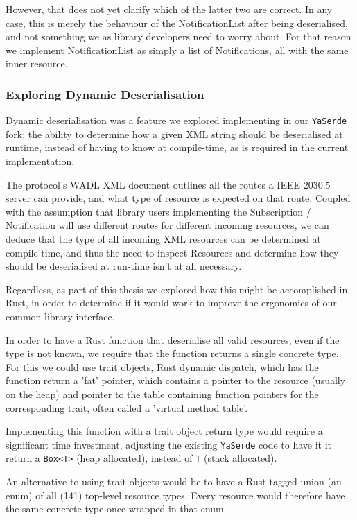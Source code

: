 However, that does not yet clarify which of the latter two are correct. In any case, this is merely the behaviour of the NotificationList after being deserialised, and not something we as library developers need to worry about. For that reason we implement NotificationList as simply a list of Notifications, all with the same inner resource.

\subsubsection{Exploring Dynamic Deserialisation}
Dynamic deserialisation was a feature we explored implementing in our \texttt{YaSerde} fork; the ability to determine how a given XML string should be deserialised at runtime, instead of having to know at compile-time, as is required in the current implementation.

The protocol's WADL XML document outlines all the routes a IEEE 2030.5 server can provide, and what type of resource is expected on that route. Coupled with the assumption that library users implementing the Subscription / Notification will use different routes for different incoming resources, we can deduce that the type of all incoming XML resources can be determined at compile time, and thus the need to inspect Resources and determine how they should be deserialised at run-time isn't at all necessary. 

Regardless, as part of this thesis we explored how this might be accomplished in Rust, in order to determine if it would work to improve the ergonomics of our common library interface.

In order to have a Rust function that deserialise all valid resources, even if the type is not known, we require that the function returns a single concrete type. For this we could use trait objects, Rust dynamic dispatch, which has the function return a 'fat' pointer, which contains a pointer to the resource (usually on the heap) and pointer to the table containing function pointers for the corresponding trait, often called a 'virtual method table'. 

Implementing this function with a trait object return type would require a significant time investment, adjusting the existing \texttt{YaSerde} code to have it it return a \texttt{Box<T>} (heap allocated), instead of \texttt{T} (stack allocated).

An alternative to using trait objects would be to have a Rust tagged union (an enum) of all (141) top-level resource types. Every resource would therefore have the same concrete type once wrapped in that enum.

